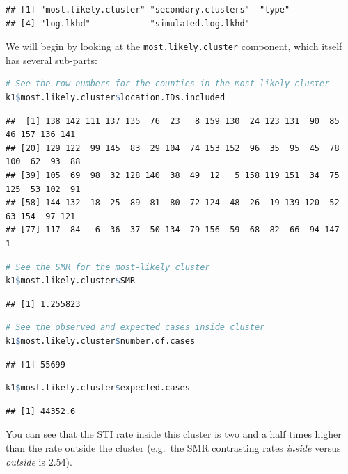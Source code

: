 \documentclass[
]{book}
\newcommand{\passthrough}[1]{#1}
\begin{document}
\begin{lstlisting}
## [1] "most.likely.cluster" "secondary.clusters"  "type"               
## [4] "log.lkhd"            "simulated.log.lkhd"
\end{lstlisting}

We will begin by looking at the \passthrough{\lstinline!most.likely.cluster!} component, which itself has several sub-parts:

\begin{lstlisting}[language=R]
# See the row-numbers for the counties in the most-likely cluster
k1$most.likely.cluster$location.IDs.included
\end{lstlisting}

\begin{lstlisting}
##  [1] 138 142 111 137 135  76  23   8 159 130  24 123 131  90  85  46 157 136 141
## [20] 129 122  99 145  83  29 104  74 153 152  96  35  95  45  78 100  62  93  88
## [39] 105  69  98  32 128 140  38  49  12   5 158 119 151  34  75 125  53 102  91
## [58] 144 132  18  25  89  81  80  72 124  48  26  19 139 120  52  63 154  97 121
## [77] 117  84   6  36  37  50 134  79 156  59  68  82  66  94 147   1
\end{lstlisting}

\begin{lstlisting}[language=R]
# See the SMR for the most-likely cluster
k1$most.likely.cluster$SMR
\end{lstlisting}

\begin{lstlisting}
## [1] 1.255823
\end{lstlisting}

\begin{lstlisting}[language=R]
# See the observed and expected cases inside cluster
k1$most.likely.cluster$number.of.cases
\end{lstlisting}

\begin{lstlisting}
## [1] 55699
\end{lstlisting}

\begin{lstlisting}[language=R]
k1$most.likely.cluster$expected.cases
\end{lstlisting}

\begin{lstlisting}
## [1] 44352.6
\end{lstlisting}

You can see that the STI rate inside this cluster is two and a half times higher than the rate outside the cluster (e.g.~the SMR contrasting rates \emph{inside} versus \emph{outside} is 2.54).
\end{document}
